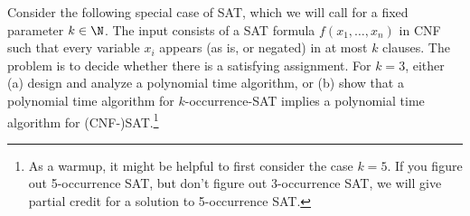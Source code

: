 \documentclass{article}
\begin{document}
\setcounter{section}{9}
\setcounter{exercise}{8}
\begin{exercise}
  Consider the following special case of SAT, which we will call  for a fixed parameter \( k \in \N \).
  The input consists of a SAT formula \( f (x_1, \ldots, x_n) \) in CNF such that every variable \( x_i \) appears (as is, or negated) in at most \( k \) clauses.
  The problem is to decide whether there is a satisfying assignment.
  For \( k = 3 \), either (a) design and analyze a polynomial time algorithm, or (b) show that a polynomial time algorithm for \( k \)-occurrence-SAT implies a polynomial time algorithm for (CNF-)SAT.\footnote{As a warmup, it might be helpful to first consider the case \( k = 5 \).
  If you figure out 5-occurrence SAT, but don't figure out 3-occurrence SAT, we will give partial credit for a solution to 5-occurrence SAT.}
\end{exercise}
\end{document}
